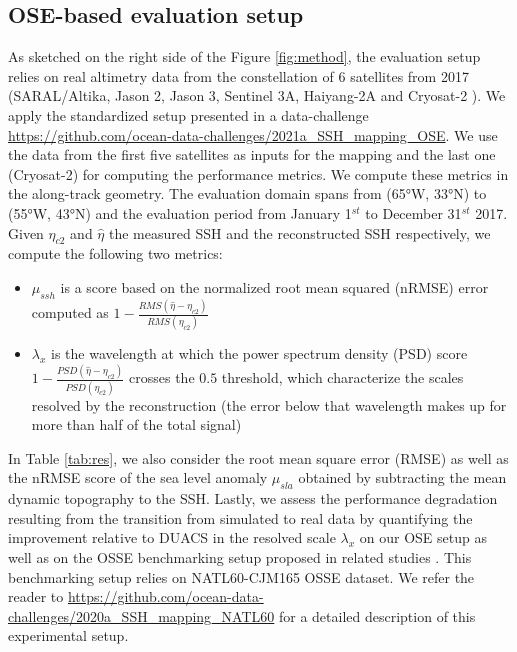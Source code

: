 \begin{bibunit}
\subsection{OSE-based evaluation setup}
\label{ssec:eval}
As sketched on the right side of the Figure \ref{fig:method},
the evaluation setup relies on real altimetry data from the constellation of 6 satellites from 2017 (SARAL/Altika, Jason 2, Jason 3, Sentinel 3A, Haiyang-2A and Cryosat-2 ).
We apply the standardized setup presented in a data-challenge \url{https://github.com/ocean-data-challenges/2021a_SSH_mapping_OSE}.
We use the data from the first five satellites as inputs for the mapping and the last one (Cryosat-2) for computing the performance metrics. We compute these metrics in the along-track geometry. %
The evaluation domain spans from (65°W, 33°N) to (55°W, 43°N)  and the evaluation period from January 1$^{st}$ to December 31$^{st}$ 2017.  Given $\eta_{c2}$ and $\hat{\eta}$ the measured SSH and the reconstructed SSH respectively, we compute the following two metrics:
\begin{itemize}
    \item $\mu_{ssh}$ is a score based on the normalized root mean squared (nRMSE) error  computed as $1 - \displaystyle\frac{RMS(\hat{\eta} - \eta_{c2})}{RMS(\eta_{c2})}$
    \item $\lambda_x$ is the wavelength at which the power spectrum density (PSD) score  $1 - \displaystyle \frac{PSD(\hat{\eta} - \eta_{c2})}{PSD(\eta_{c2})}$ crosses the $0.5$ threshold, which characterize the scales resolved by the reconstruction (the error below that wavelength makes up for more than half of the total signal)
\end{itemize}

In Table \ref{tab:res}, we also consider the root mean square error (RMSE) as well as the nRMSE score of the sea level anomaly $\mu_{sla}$ obtained by subtracting the mean dynamic topography to the SSH. Lastly, we assess the performance degradation resulting from the transition from simulated to real data by quantifying the improvement relative to DUACS in the resolved scale $\lambda_x$ on our OSE setup as well as on
the OSSE benchmarking setup proposed in related studies \cite{guillouMappingAltimetryForthcoming2021}. This benchmarking setup relies on NATL60-CJM165 OSSE dataset. We refer the reader to \url{https://github.com/ocean-data-challenges/2020a_SSH_mapping\_NATL60} for a detailed description of this experimental setup.





\end{bibunit}
